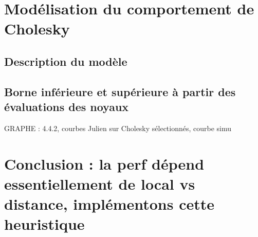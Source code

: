 \section{Modélisation du comportement de Cholesky}
\subsection{Description du modèle}
\subsection{Borne inférieure et supérieure à partir des évaluations des noyaux}

GRAPHE : 4.4.2, courbes Julien sur Cholesky sélectionnés, courbe simu
\section{Conclusion : la perf dépend essentiellement de local vs distance, implémentons cette heuristique}
